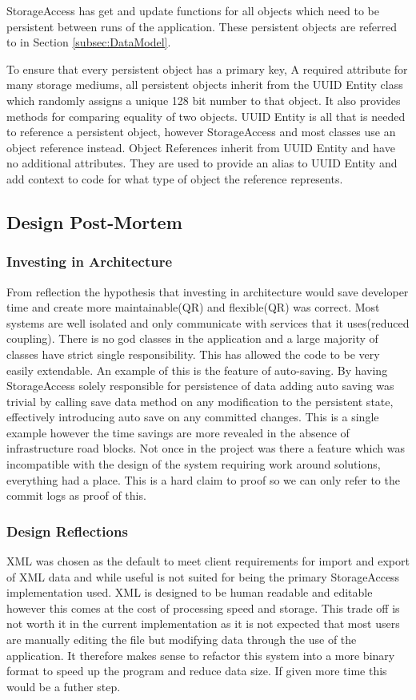 StorageAccess has get and update functions for all objects which need to be persistent between runs of the application. These persistent objects are referred to in Section \ref{subsec:DataModel}.

To ensure that every persistent object has a primary key, A required attribute for many storage mediums, all persistent objects inherit from the UUID Entity class which randomly assigns a unique 128 bit number to that object. It also provides methods for comparing equality of two objects. UUID Entity is all that is needed to reference a persistent object, however StorageAccess and most classes use an object reference instead. Object References inherit from UUID Entity and have no additional attributes. They are used to provide an alias to UUID Entity and add context to code for what type of object the reference represents.

\pagebreak

\subsection{Design Post-Mortem}
\subsubsection{Investing in Architecture}
From reflection the hypothesis that investing in architecture would save developer time and create more maintainable(QR) and flexible(QR) was correct. Most systems are well isolated and only communicate with services that it uses(reduced coupling). There is no god classes in the application and a large majority of classes have strict single responsibility. This has allowed the code to be very easily extendable. An example of this is the feature of auto-saving. By having StorageAccess solely responsible for persistence of data adding auto saving was trivial by calling save data method on any modification to the persistent state, effectively introducing auto save on any committed changes. This is a single example however the time savings are more revealed in the absence of infrastructure road blocks. Not once in the project was there a feature which was incompatible with the design of the system requiring work around solutions, everything had a place. This is a hard claim to proof so we can only refer to the commit logs as proof of this.

\subsubsection{Design Reflections}
XML was chosen as the default to meet client requirements for import and export of XML data and while useful is not suited for being the primary StorageAccess implementation used.
XML is designed to be human readable and editable however this comes at the cost of processing speed and storage. This trade off is not worth it in the current implementation
as it is not expected that most users are manually editing the file but modifying data through the use of the application. It therefore makes sense to refactor this system into a more binary format
to speed up the program and reduce data size. If given more time this would be a futher step.\\

